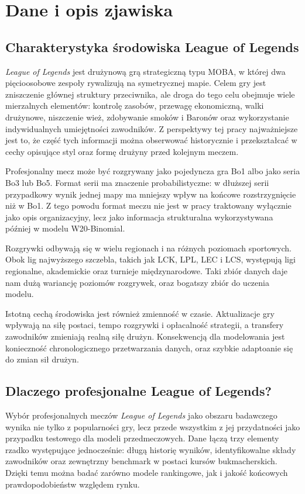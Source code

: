 \chapter{Dane i opis zjawiska}

\section{Charakterystyka środowiska League of Legends}

\textit{League of Legends} jest drużynową grą strategiczną typu MOBA, w której dwa pięcioosobowe
zespoły rywalizują na symetrycznej mapie. Celem gry jest zniszczenie głównej struktury przeciwnika,
ale droga do tego celu obejmuje wiele mierzalnych elementów: kontrolę zasobów, przewagę ekonomiczną,
walki drużynowe, niszczenie wież, zdobywanie smoków i Baronów oraz wykorzystanie indywidualnych
umiejętności zawodników. Z perspektywy tej pracy najważniejsze jest to, że część tych informacji
można obserwować historycznie i przekształcać w cechy opisujące styl oraz formę drużyny przed
kolejnym meczem.

Profesjonalny mecz może być rozgrywany jako pojedyncza gra Bo1 albo jako seria Bo3 lub Bo5. Format
serii ma znaczenie probabilistyczne: w dłuższej serii przypadkowy wynik jednej mapy ma mniejszy
wpływ na końcowe rozstrzygnięcie niż w Bo1. Z tego powodu format meczu nie jest w pracy traktowany
wyłącznie jako opis organizacyjny, lecz jako informacja strukturalna wykorzystywana później w modelu
W20-Binomial.

Rozgrywki odbywają się w wielu regionach i na różnych poziomach sportowych. Obok lig najwyższego
szczebla, takich jak LCK, LPL, LEC i LCS, występują ligi regionalne, akademickie oraz turnieje
międzynarodowe. Taki zbiór danych daje nam dużą wariancję poziomów rozgrywek, oraz bogatszy zbiór do
uczenia modelu.

Istotną cechą środowiska jest również zmienność w czasie. Aktualizacje gry wpływają na siłę postaci,
tempo rozgrywki i opłacalność strategii, a transfery zawodników zmieniają realną siłę drużyn.
Konsekwencją dla modelowania jest konieczność chronologicznego przetwarzania danych, oraz szybkie
adaptoanie się do zmian sił drużyn.

\section{Dlaczego profesjonalne League of Legends?}

Wybór profesjonalnych meczów \textit{League of Legends} jako obszaru badawczego wynika nie tylko z
popularności gry, lecz przede wszystkim z jej przydatności jako przypadku testowego dla modeli
przedmeczowych. Dane łączą trzy elementy rzadko występujące jednocześnie: długą historię wyników,
identyfikowalne składy zawodników oraz zewnętrzny benchmark w postaci kursów bukmacherskich. Dzięki
temu można badać zarówno modele rankingowe, jak i jakość końcowych prawdopodobieństw względem rynku.


